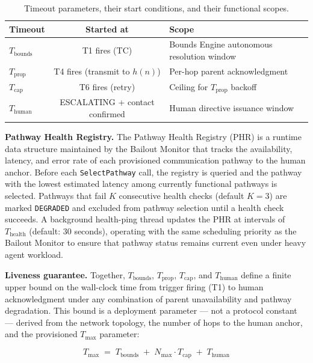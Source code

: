 \begin{table}[htbp]
\centering
\caption{Timeout parameters, their start conditions, and their functional scopes.}
\label{tab:timeouts}
\begin{tabular}{lcl}
\hline
\textbf{Timeout} & \textbf{Started at} & \textbf{Scope} \\ \hline
$T_{\text{bounds}}$ & T1 fires (TC) & Bounds Engine autonomous resolution window \\
$T_{\text{prop}}$ & T4 fires (transmit to $h(n)$) & Per-hop parent acknowledgment \\
$T_{\text{cap}}$ & T6 fires (retry) & Ceiling for $T_{\text{prop}}$ backoff \\
$T_{\text{human}}$ & ESCALATING + contact confirmed & Human directive issuance window \\
\hline
\end{tabular}
\end{table}

\medskip\noindent\textbf{Pathway Health Registry.} The Pathway Health Registry (PHR) is a runtime data structure maintained by the Bailout Monitor that tracks the availability, latency, and error rate of each provisioned communication pathway to the human anchor. Before each \texttt{SelectPathway} call, the registry is queried and the pathway with the lowest estimated latency among currently functional pathways is selected. Pathways that fail $K$ consecutive health checks (default $K = 3$) are marked \texttt{DEGRADED} and excluded from pathway selection until a health check succeeds. A background health-ping thread updates the PHR at intervals of $T_{\text{health}}$ (default: 30 seconds), operating with the same scheduling priority as the Bailout Monitor to ensure that pathway status remains current even under heavy agent workload.

\medskip\noindent\textbf{Liveness guarantee.} Together, $T_{\text{bounds}}$, $T_{\text{prop}}$, $T_{\text{cap}}$, and $T_{\text{human}}$ define a finite upper bound on the wall-clock time from trigger firing (T1) to human acknowledgment under any combination of parent unavailability and pathway degradation. This bound is a deployment parameter — not a protocol constant — derived from the network topology, the number of hops to the human anchor, and the provisioned $T_{\max}$ parameter:

\begin{equation}
T_{\max} \;=\; T_{\text{bounds}} \;+\; N_{\max} \cdot T_{\text{cap}} \;+\; T_{\text{human}} \tag{T-max}
\end{equation}

